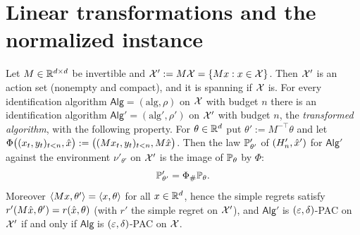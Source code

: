 \section{Linear transformations and the normalized instance}
\label{sec:lower_adaptive_transform}

\begin{lemma}\label{lem:transform_preserves_pac}
Let $M \in \mathbb{R}^{d\times d}$ be invertible and $\mathcal{X}' := M\mathcal{X} = \{Mx : x \in \mathcal{X}\}$. Then $\mathcal{X}'$
is an action set (nonempty and compact), and it is spanning if $\mathcal{X}$ is. For every identification algorithm
$\mathsf{Alg} = (\mathrm{alg}, \rho)$ on $\mathcal{X}$ with budget $n$ there is an identification
algorithm $\mathsf{Alg}' = (\mathrm{alg}',\rho')$ on $\mathcal{X}'$ with budget $n$, the
\emph{transformed algorithm}, with the following property. For $\theta \in \mathbb{R}^d$ put
$\theta' := M^{-\top}\theta$ and let
$\Phi\big((x_t,y_t)_{t<n}, \hat{x}\big) := \big((Mx_t, y_t)_{t<n}, M\hat{x}\big)$. Then the law
$\mathbb{P}'_{\theta'}$ of $(H'_n, \hat{x}')$ for $\mathsf{Alg}'$ against the environment
$\nu'_{\theta'}$ on $\mathcal{X}'$ is the image of $\mathbb{P}_\theta$ by $\Phi$:
\[
  \mathbb{P}'_{\theta'} = \Phi_\#\mathbb{P}_\theta .
\]
Moreover $\langle Mx, \theta' \rangle = \langle x, \theta \rangle$ for all $x \in \mathbb{R}^d$, hence the simple regrets
satisfy $r'(M\hat{x}, \theta') = r(\hat{x},\theta)$ (with $r'$ the simple regret on $\mathcal{X}'$), and
$\mathsf{Alg}'$ is $(\varepsilon,\delta)$-PAC on $\mathcal{X}'$ if and only if $\mathsf{Alg}$ is
$(\varepsilon,\delta)$-PAC on $\mathcal{X}$.
\end{lemma}

